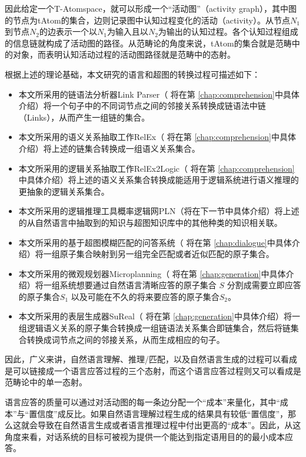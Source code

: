 因此给定一个T-Atomspace，就可以形成一个“活动图”（activity graph），其中图的节点为tAtom的集合，边则记录图中认知过程变化的活动（activity）。从节点$N_1$ 到节点$N_2$的边表示一个以$N_1$为输入且以$N_2$为输出的认知过程。各个认知过程组成的信息链就构成了活动图的路径。从范畴论的角度来说，tAtom的集合就是范畴中的对象，而表明认知活动过程的活动图路径就是范畴中的态射。

根据上述的理论基础，本文研究的语言和超图的转换过程可描述如下：

\begin{itemize}
\item 本文所采用的链语法分析器Link Parser（ 将在第 \ref{chap:comprehension}中具体介绍）将一个句子中的不同词节点之间的邻接关系转换成链语法中链（Links），从而产生一组链的集合。
\item 本文所采用的语义关系抽取工作RelEx（ 将在第 \ref{chap:comprehension}中具体介绍）将上述的链集合转换成一组语义关系集合。
\item 本文所采用的逻辑关系抽取工作RelEx2Logic（ 将在第 \ref{chap:comprehension}中具体介绍）将上述的语义关系集合转换成能适用于逻辑系统进行语义推理的更抽象的逻辑关系集合。
\item 本文所采用的逻辑推理工具概率逻辑网PLN（将在下一节中具体介绍）将上述的从自然语言中抽取到的知识与超图知识库中的其他种类的知识相关联。
\item 本文所采用的基于超图模糊匹配的问答系统（ 将在第 \ref{chap:dialogue}中具体介绍）将一组原子集合映射到另一组完全匹配或者近似匹配的原子集合。
\item 本文所采用的微观规划器Microplanning（ 将在第 \ref{chap:generation}中具体介绍）将一组系统想要通过自然语言清晰应答的原子集合 $S$ 分割成需要立即应答的原子集合$S_1$ 以及可能在不久的将来要应答的原子集合$S_2$。
\item 本文所采用的表层生成器SuReal（ 将在第 \ref{chap:generation}中具体介绍）将一组逻辑语义关系的原子集合转换成一组链语法关系集合即链集合，然后将链集合转换成词节点之间的邻接关系，从而生成相应的句子。
\end{itemize}

因此，广义来讲，自然语言理解、推理/匹配，以及自然语言生成的过程可以看成是可以链接成一个语言应答过程的三个态射，而这个语言应答过程则又可以看成是范畴论中的单一态射。

语言应答的质量可以通过对活动图的每一条边分配一个“成本”来量化，其中“成本”与“置信度”成反比。如果自然语言理解过程生成的结果具有较低“置信度”，那么这就会导致在自然语言生成或者语言推理过程中付出更高的“成本”。因此，从这角度来看，对话系统的目标可被视为提供一个能达到指定语用目的的最小成本应答。

